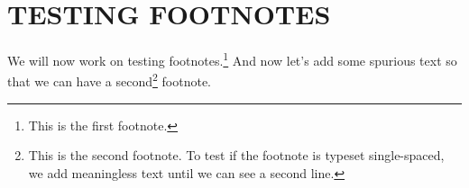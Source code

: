 \documentclass[12pt,Bold,letterpaper,TexShade]{mcgilletdclass}
\numberwithin{equation}{section}
\begin{document}
\newpage




\chapter{TESTING FOOTNOTES}
We will now work on testing footnotes.\footnote{This is the first footnote.}
And now let's add some spurious text so that we can have a second\footnote{This
is the second footnote. To test if the footnote is typeset single-spaced, 
we add meaningless text until we can see a second line.} footnote.




	
	




%
%
%
%





\end{document}
